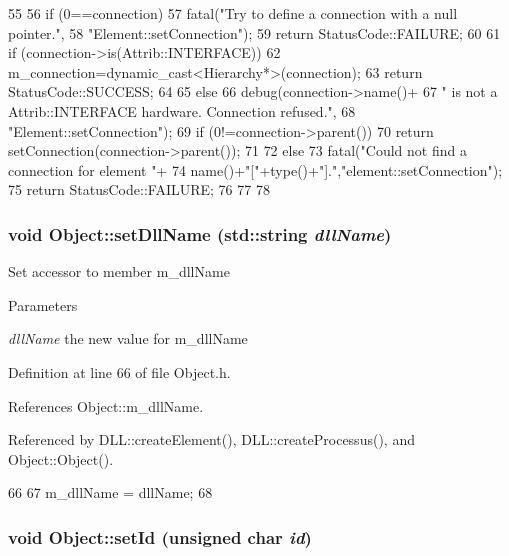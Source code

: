 \begin{DoxyCode}
55                                                       {
56   if (0==connection){
57     fatal("Try to define a connection with a null pointer.",
58         "Element::setConnection");
59     return StatusCode::FAILURE;
60   }
61   if (connection->is(Attrib::INTERFACE)){
62     m_connection=dynamic_cast<Hierarchy*>(connection);
63     return StatusCode::SUCCESS;
64   }
65   else {
66     debug(connection->name()+
67         " is not a Attrib::INTERFACE hardware. Connection refused.",
68         "Element::setConnection");
69     if (0!=connection->parent()){
70       return setConnection(connection->parent());
71     }
72     else{
73       fatal("Could not find a connection for element "+
74           name()+"["+type()+"].","element::setConnection");
75       return StatusCode::FAILURE;
76     }
77   }
78 }
\end{DoxyCode}
\hypertarget{classObject_a870c5af919958c2136623b2d7816d123}{
\subsubsection[{setDllName}]{\setlength{\rightskip}{0pt plus 5cm}void Object::setDllName (std::string {\em dllName})}}
\label{classObject_a870c5af919958c2136623b2d7816d123}
Set accessor to member m\_\-dllName 
\begin{DoxyParams}{Parameters}
\item[{\em dllName}]the new value for m\_\-dllName \end{DoxyParams}


Definition at line 66 of file Object.h.

References Object::m\_\-dllName.

Referenced by DLL::createElement(), DLL::createProcessus(), and Object::Object().


\begin{DoxyCode}
66                                       {
67     m_dllName = dllName;
68   }
\end{DoxyCode}
\hypertarget{classObject_a398fe08cba594a0ce6891d59fe4f159f}{
\subsubsection[{setId}]{\setlength{\rightskip}{0pt plus 5cm}void Object::setId (unsigned char {\em id})}}
\label{classObject_a398fe08cba594a0ce6891d59fe4f159f}



